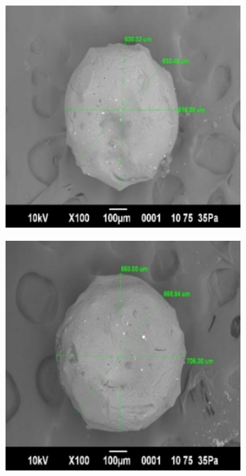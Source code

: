 \begin{figure}[H]
	\centering
	\includegraphics[width=0.8\textwidth]{media/pish/image29}
	\caption*{}
\end{figure}


\begin{figure}[H]
	\centering
	\includegraphics[width=0.8\textwidth]{media/pish/image30}
	\caption*{}
\end{figure}



